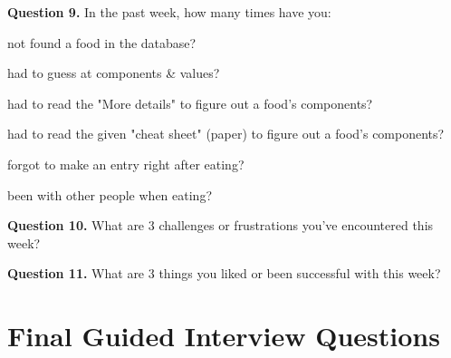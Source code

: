 \noindent\textbf{Question 9.}
In the past week, how many times have you: 

\begin{itemize*}
\item not found a food in the database?		
\item had to guess at components \& values?		
\item had to read the "More details" to figure out a food's components?		
\item had to read the given "cheat sheet" (paper) to figure out a food's components?		
\item forgot to make an entry right after eating?		
\item been with other people when eating?		
\end{itemize*}

\noindent\textbf{Question 10.}
What are 3 challenges or frustrations you've encountered this week?  
 

\noindent\textbf{Question 11.}
What are 3 things you liked or been successful with this week?  
 

\section{Final Guided Interview Questions}
